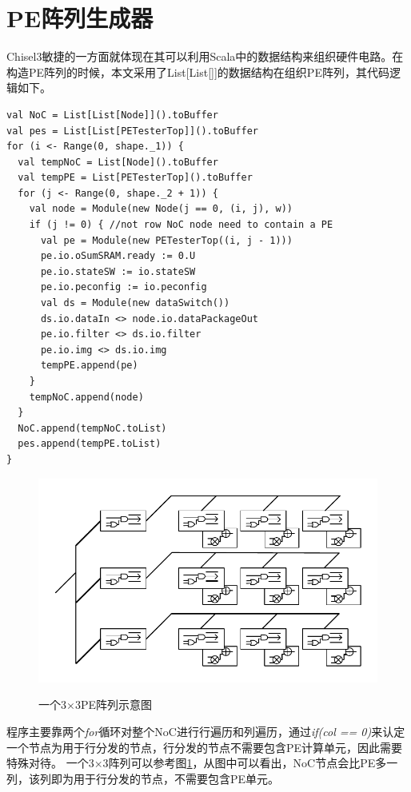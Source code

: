 \section{PE阵列生成器}
Chisel3敏捷的一方面就体现在其可以利用Scala中的数据结构来组织硬件电路。在构造PE阵列的时候，本文采用了List[List[]]的数据结构在组织PE阵列，其代码逻辑如下。
            \begin{lstlisting}[title=Chisel 快速构建PE阵列, frame=shadowbox]
val NoC = List[List[Node]]().toBuffer
val pes = List[List[PETesterTop]]().toBuffer
for (i <- Range(0, shape._1)) {
  val tempNoC = List[Node]().toBuffer
  val tempPE = List[PETesterTop]().toBuffer
  for (j <- Range(0, shape._2 + 1)) {
    val node = Module(new Node(j == 0, (i, j), w))
    if (j != 0) { //not row NoC node need to contain a PE
      val pe = Module(new PETesterTop((i, j - 1)))
      pe.io.oSumSRAM.ready := 0.U
      pe.io.stateSW := io.stateSW
      pe.io.peconfig := io.peconfig
      val ds = Module(new dataSwitch())
      ds.io.dataIn <> node.io.dataPackageOut
      pe.io.filter <> ds.io.filter
      pe.io.img <> ds.io.img
      tempPE.append(pe)
    }
    tempNoC.append(node)
  }
  NoC.append(tempNoC.toList)
  pes.append(tempPE.toList)
}
            \end{lstlisting}
\begin{figure}[h]
    \centering
    \includegraphics{../pdf/PEArray.pdf}\\
    \caption{一个3×3PE阵列示意图}
    \label{33arr}
\end{figure}
    程序主要靠两个\emph{for}循环对整个NoC进行行遍历和列遍历，通过\emph{if(col == 0)}来认定一个节点为用于行分发的节点，行分发的节点不需要包含PE计算单元，因此需要特殊对待。
    一个3×3阵列可以参考图\ref{33arr}，从图中可以看出，NoC节点会比PE多一列，该列即为用于行分发的节点，不需要包含PE单元。

